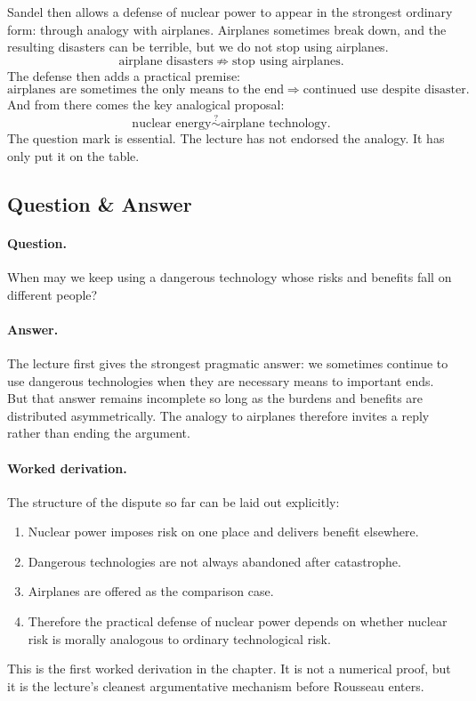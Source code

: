 Sandel then allows a defense of nuclear power to appear in the strongest ordinary form: through analogy with airplanes. Airplanes sometimes break down, and the resulting disasters can be terrible, but we do not stop using airplanes.
\begin{equation}
\text{airplane disasters}
\not\Rightarrow
\text{stop using airplanes}.
\end{equation}
The defense then adds a practical premise:
\begin{equation}
\text{airplanes are sometimes the only means to the end}
\Longrightarrow
\text{continued use despite disaster}.
\end{equation}
And from there comes the key analogical proposal:
\begin{equation}
\text{nuclear energy}
\stackrel{?}{\sim}
\text{airplane technology}.
\end{equation}
The question mark is essential. The lecture has not endorsed the analogy. It has only put it on the table.

\subsection{Question \& Answer}

\paragraph{Question.} When may we keep using a dangerous technology whose risks and benefits fall on different people?

\paragraph{Answer.} The lecture first gives the strongest pragmatic answer: we sometimes continue to use dangerous technologies when they are necessary means to important ends. But that answer remains incomplete so long as the burdens and benefits are distributed asymmetrically. The analogy to airplanes therefore invites a reply rather than ending the argument.

\paragraph{Worked derivation.} The structure of the dispute so far can be laid out explicitly:
\begin{enumerate}
\item Nuclear power imposes risk on one place and delivers benefit elsewhere.
\item Dangerous technologies are not always abandoned after catastrophe.
\item Airplanes are offered as the comparison case.
\item Therefore the practical defense of nuclear power depends on whether nuclear risk is morally analogous to ordinary technological risk.
\end{enumerate}
This is the first worked derivation in the chapter. It is not a numerical proof, but it is the lecture's cleanest argumentative mechanism before Rousseau enters.

